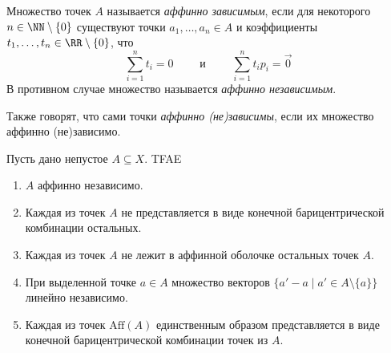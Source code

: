 \documentclass[12pt,a4paper]{article}
\newcommand{\Aff}{\ensuremath{\mathrm{Aff}}\xspace}
\begin{document}
    \begin{definition}
        Множество точек $A$ называется \emph{аффинно зависимым}, если для некоторого $n \in \NN \setminus \{0\}$ существуют точки $a_1, \dots, a_n \in A$ и коэффициенты $t_1, \dots, t_n \in \RR \setminus \{0\}$, что
        \[\sum_{i=1}^n t_i = 0\qquad \text{ и }\qquad \sum_{i=1}^n t_i p_i = \overrightarrow{0}\]
        В противном случае множество называется \emph{аффинно независимым}.

        Также говорят, что сами точки \emph{аффинно (не)зависимы}, если их множество аффинно (не)зависимо.
    \end{definition}

    \begin{theorem}
        Пусть дано непустое $A \subseteq X$. TFAE
        \begin{enumerate}
            \item $A$ аффинно независимо.
            \item Каждая из точек $A$ не представляется в виде конечной барицентрической комбинации остальных.
            \item Каждая из точек $A$ не лежит в аффинной оболочке остальных точек $A$.
            \item При выделенной точке $a \in A$ множество векторов $\{a' - a \mid a' \in A \setminus \{a\}\}$ линейно независимо.
            \item Каждая из точек $\Aff(A)$ единственным образом представляется в виде конечной барицентрической комбинации точек из $A$.
        \end{enumerate}
    \end{theorem}
\end{document}
